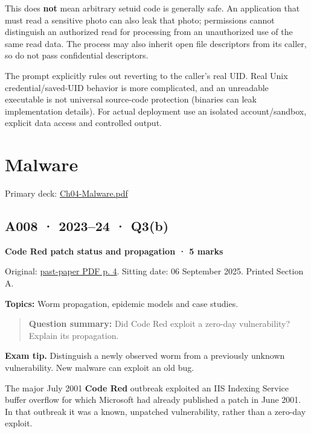 \documentclass[11pt,a4paper]{article}
\begin{document}
This does \textbf{not} mean arbitrary setuid code is generally safe. An application that must read a sensitive photo can also leak that photo; permissions cannot distinguish an authorized read for processing from an unauthorized use of the same read data. The process may also inherit open file descriptors from its caller,\allowbreak{} so do not pass confidential descriptors.


The prompt explicitly rules out reverting to the caller's real UID. Real Unix credential/\allowbreak{}saved-UID behavior is more complicated,\allowbreak{} and an unreadable executable is not universal source-code protection (binaries can leak implementation details). For actual deployment use an isolated account/\allowbreak{}sandbox,\allowbreak{} explicit data access and controlled output.



\clearpage
\section{Malware}

Primary deck: \href{../slides/Ch04-Malware.pdf}{Ch04-Malware.\allowbreak{}pdf}




\subsection{A008 · 2023–24 · Q3(b)}\label{a008}

\textbf{Code Red patch status and propagation · 5 marks}


Original: \href{../../CSE405-Security_Merged.pdf\#page=4}{past-paper PDF p. 4}. Sitting date: 06 September 2025. Printed Section A.


\textbf{Topics:} Worm propagation,\allowbreak{} epidemic models and case studies.



\begin{quote}\small

\textbf{Question summary:} Did Code Red exploit a zero-day vulnerability? Explain its propagation.



\end{quote}


{\color{ForestGreen}\textbf{Exam tip.} Distinguish a newly observed worm from a previously unknown vulnerability. New malware can exploit an old bug.}


The major July 2001 \textbf{Code Red} outbreak exploited an IIS Indexing Service buffer overflow for which Microsoft had already published a patch in June 2001. In that outbreak it was a known,\allowbreak{} unpatched vulnerability,\allowbreak{} rather than a zero-day exploit.
\end{document}
